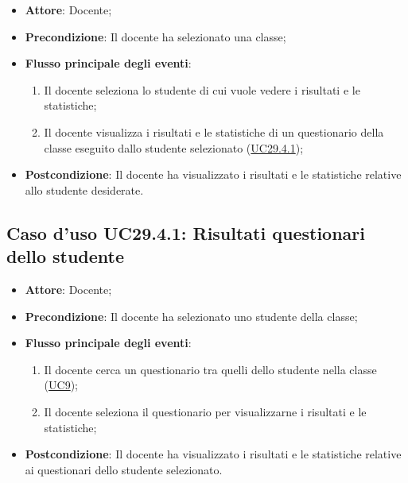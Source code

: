 \documentclass[12pt,a4paper]{article}
\begin{document}
\begin{itemize}

\item \textbf{Attore}: Docente; 
\item \textbf{Precondizione}: Il docente ha selezionato una classe;

\item \textbf{Flusso principale degli eventi}:
\begin{enumerate}
	\item Il docente seleziona lo studente di cui vuole vedere i risultati e le statistiche;
	\item Il docente visualizza i risultati e le statistiche di un questionario della classe eseguito dallo studente selezionato (\hyperlink{UC29.4.1}{UC29.4.1});
	
\end{enumerate}
\item \textbf{Postcondizione}: Il docente ha visualizzato i risultati e le statistiche relative allo studente desiderate.
\end{itemize}
\hypertarget{UC29.4.1}{}
\subsection{Caso d'uso UC29.4.1: Risultati questionari dello studente}

\begin{itemize}

\item \textbf{Attore}: Docente; 
\item \textbf{Precondizione}: Il docente ha selezionato uno studente della classe;

\item \textbf{Flusso principale degli eventi}:
\begin{enumerate}
	\item Il docente cerca un questionario tra quelli dello studente nella classe (\hyperlink{UC9}{UC9});
	\item Il docente seleziona il questionario per visualizzarne i risultati e le statistiche;
	
\end{enumerate}
\item \textbf{Postcondizione}: Il docente ha visualizzato i risultati e le statistiche relative ai questionari dello studente selezionato.
\end{itemize}
\hypertarget{UC30}{}
\end{document}
